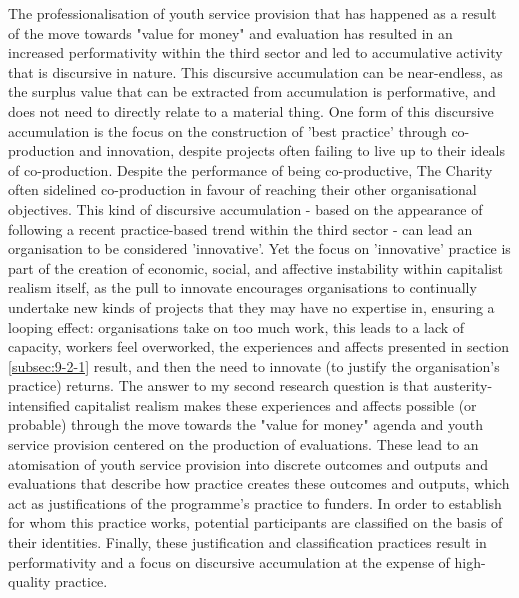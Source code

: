 The professionalisation of youth service provision that has happened as a result of the move towards "value for money" and evaluation has resulted in an increased performativity within the third sector and led to accumulative activity that is discursive in nature. This discursive accumulation can be near-endless, as the surplus value that can be extracted from accumulation is performative, and does not need to directly relate to a material thing. One form of this discursive accumulation is the focus on the construction of 'best practice' through co-production and innovation, despite projects often failing to live up to their ideals of co-production. Despite the performance of being co-productive, The Charity often sidelined co-production in favour of reaching their other organisational objectives. This kind of discursive accumulation - based on the appearance of following a recent practice-based trend within the third sector - can lead an organisation to be considered 'innovative'. Yet the focus on 'innovative' practice is part of the creation of economic, social, and affective instability within capitalist realism itself, as the pull to innovate encourages organisations to continually undertake new kinds of projects that they may have no expertise in, ensuring a looping effect: organisations take on too much work, this leads to a lack of capacity, workers feel overworked, the experiences and affects presented in section \ref{subsec:9-2-1} result, and then the need to innovate (to justify the organisation's practice) returns.  The answer to my second research question is that austerity-intensified capitalist realism makes these experiences and affects possible (or probable) through the move towards the "value for money" agenda and youth service provision centered on the production of evaluations. These lead to an atomisation of youth service provision into discrete outcomes and outputs and evaluations that describe how practice creates these outcomes and outputs, which act as justifications of the programme's practice to funders. In order to establish for whom this practice works, potential participants are classified on the basis of their identities. Finally, these justification and classification practices result in performativity and a focus on discursive accumulation at the expense of high-quality practice. 

